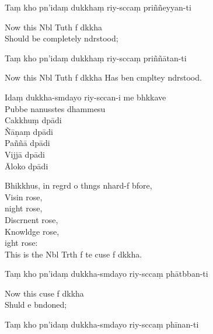 Taṃ kho pn'idaṃ dukkhaṃ riy-sccaṃ priññeyyan-ti

\begin{english}
  Now this Nbl Tuth f dkkha\\
  Should be completely ndrstood;
\end{english}

Taṃ kho pn'idaṃ dukkhaṃ riy-sccaṃ priññātan-ti

\begin{english}
  Now this Nbl Tuth f dkkha
  Has ben cmpltey ndrstood.
\end{english}

Idaṃ dukkha-smdayo riy-sccan-i me bhkkave\\
Pubbe nanusstes dhammesu\\
Cakkhuṃ dpādi\\
Ñāṇaṃ dpādi\\
Paññā dpādi\\
Vijjā dpādi\\
Āloko dpādi

\begin{english}
  Bhikkhus, in regrd o thngs nhard-f bfore,\\
  Visin rose,\\
  night rose,\\
  Discrnent rose,\\
  Knowldge rose,\\
  ight rose:\\
  This is the Nbl Trth f te cuse f dkkha.
\end{english}

\clearpage

Taṃ kho pn'idaṃ dukkha-smdayo riy-sccaṃ phātbban-ti

\begin{english}
  Now this cuse f dkkha\\
  Shuld e bndoned;
\end{english}

Taṃ kho pn'idaṃ dukkha-smdayo riy-sccaṃ phīnan-ti

